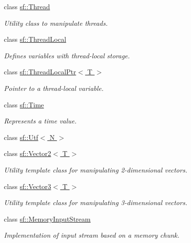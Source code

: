\begin{DoxyCompactItemize}
class \hyperlink{classsf_1_1_thread}{sf\-::\-Thread}
\begin{DoxyCompactList}\small\item\em Utility class to manipulate threads. \end{DoxyCompactList}\item 
class \hyperlink{classsf_1_1_thread_local}{sf\-::\-Thread\-Local}
\begin{DoxyCompactList}\small\item\em Defines variables with thread-\/local storage. \end{DoxyCompactList}\item 
class \hyperlink{classsf_1_1_thread_local_ptr}{sf\-::\-Thread\-Local\-Ptr$<$ T $>$}
\begin{DoxyCompactList}\small\item\em Pointer to a thread-\/local variable. \end{DoxyCompactList}\item 
class \hyperlink{classsf_1_1_time}{sf\-::\-Time}
\begin{DoxyCompactList}\small\item\em Represents a time value. \end{DoxyCompactList}\item 
class \hyperlink{classsf_1_1_utf}{sf\-::\-Utf$<$ N $>$}
\item 
class \hyperlink{classsf_1_1_vector2}{sf\-::\-Vector2$<$ T $>$}
\begin{DoxyCompactList}\small\item\em Utility template class for manipulating 2-\/dimensional vectors. \end{DoxyCompactList}\item 
class \hyperlink{classsf_1_1_vector3}{sf\-::\-Vector3$<$ T $>$}
\begin{DoxyCompactList}\small\item\em Utility template class for manipulating 3-\/dimensional vectors. \end{DoxyCompactList}\item 
class \hyperlink{classsf_1_1_memory_input_stream}{sf\-::\-Memory\-Input\-Stream}
\begin{DoxyCompactList}\small\item\em Implementation of input stream based on a memory chunk. \end{DoxyCompactList}\end{DoxyCompactItemize}
